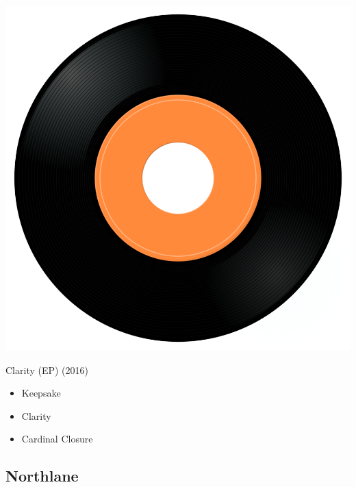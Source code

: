 \begin{minipage}[t]{0.25\textwidth}
\captionsetup{type=figure}
\includegraphics[width=\textwidth]{Images/cover.png}
\caption*{Clarity (EP) (2016)}
\end{minipage}
\begin{minipage}[t]{0.25\textwidth}\vspace{0pt}
\begin{itemize}[nosep,leftmargin=1em,labelwidth=*,align=left]
	\setlength{\itemsep}{0pt}
	\item Keepsake 
	\item Clarity
	\item Cardinal Closure
\end{itemize}
\end{minipage}

\subsection{Northlane}

